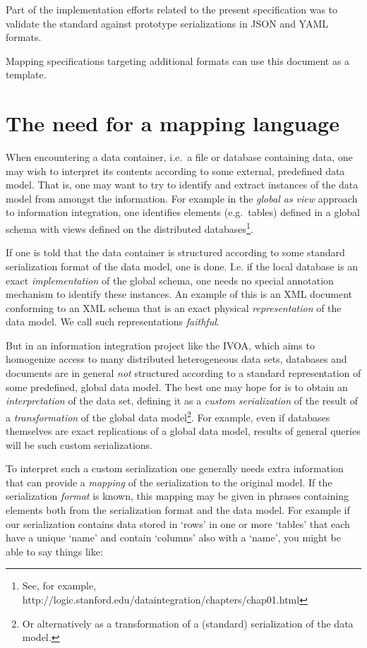 \documentclass[11pt,a4paper]{ivoa}
\begin{document}
Part of the implementation efforts related to the present specification
was to validate the standard against prototype serializations in JSON
and YAML formats.

Mapping specifications targeting additional formats can use this
document as a template.

\section{The need for a mapping
language}\label{the-need-for-a-mapping-language}

When encountering a data container, i.e.~a file or database containing
data, one may wish to interpret its contents according to some external,
predefined data model. That is, one may want to try to identify and
extract instances of the data model from amongst the information. For
example in the \emph{global as view} approach to information
integration, one identifies elements (e.g.~tables) defined in a global
schema with views defined on the distributed databases\footnote{See, for
  example,
  http://logic.stanford.edu/dataintegration/chapters/chap01.html}.

If one is told that the data container is structured according to some
standard serialization format of the data model, one is done. I.e. if
the local database is an exact \emph{implementation} of the global
schema, one needs no special annotation mechanism to identify these
instances. An example of this is an XML document conforming to an XML
schema that is an exact physical \emph{representation} of the data
model. We call such representations \emph{faithful}.

But in an information integration project like the IVOA, which aims to
homogenize access to many distributed heterogeneous data sets, databases
and documents are in general \emph{not} structured according to a
standard representation of some predefined, global data model. The best
one may hope for is to obtain an \emph{interpretation} of the data set,
defining it as a \emph{custom serialization} of the result of a
\emph{transformation} of the global data model\footnote{Or alternatively
  as a transformation of a (standard) serialization of the data model.}.
For example, even if databases themselves are exact replications of a
global data model, results of general queries will be such custom
serializations.

To interpret such a custom serialization one generally needs extra
information that can provide a \emph{mapping} of the serialization to
the original model. If the serialization \emph{format} is known, this
mapping may be given in phrases containing elements both from the
serialization format and the data model. For example if our
serialization contains data stored in `rows' in one or more `tables'
that each have a unique `name' and contain `columns' also with a `name',
you might be able to say things like:
\end{document}
